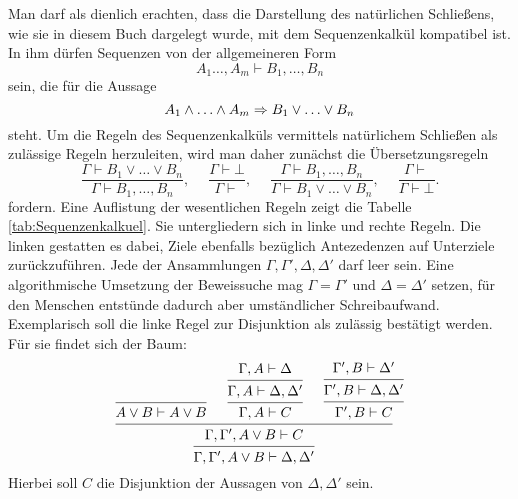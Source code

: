 Man darf als dienlich erachten, dass die Darstellung des natürlichen
Schließens, wie sie in diesem Buch dargelegt wurde, mit dem
Sequenzenkalkül kompatibel ist. In ihm dürfen Sequenzen von der
allgemeineren Form
\[A_1\ldots,A_m\vdash B_1,\ldots,B_n\]
sein, die für die Aussage
\[A_1\land\ldots\land A_m\Rightarrow B_1\lor\ldots\lor B_n\]
steht. Um die Regeln des Sequenzenkalküls vermittels natürlichem Schließen
als zulässige Regeln herzuleiten, wird man daher zunächst die
Übersetzungsregeln
\[\dfrac{\Gamma\vdash B_1\lor\ldots\lor B_n}{\Gamma\vdash B_1,\ldots,B_n},\quad\;
\dfrac{\Gamma\vdash\bot}{\Gamma\vdash},\quad\;
\dfrac{\Gamma\vdash B_1,\ldots,B_n}{\Gamma\vdash B_1\lor\ldots\lor B_n},\quad\;
\dfrac{\Gamma\vdash}{\Gamma\vdash\bot}.\]
fordern. Eine Auflistung der wesentlichen Regeln zeigt die Tabelle
\ref{tab:Sequenzenkalkuel}. Sie untergliedern sich in linke und rechte
Regeln. Die linken gestatten es dabei, Ziele ebenfalls bezüglich
Antezedenzen auf Unterziele zurückzuführen. Jede der Ansammlungen
$\Gamma,\Gamma',\Delta,\Delta'$ darf leer sein. Eine algorithmische
Umsetzung der Beweissuche mag $\Gamma=\Gamma'$ und $\Delta=\Delta'$
setzen, für den Menschen entstünde dadurch aber umständlicher
Schreibaufwand. Exemplarisch soll die linke Regel zur Disjunktion als
zulässig bestätigt werden. Für sie findet sich der Baum:
\[
\begin{prooftree}
    \infer0{A\lor B\vdash A\lor B}
        \hypo{\Gamma,A\vdash\Delta}
      \infer1{\Gamma,A\vdash\Delta,\Delta'}
    \infer1{\Gamma,A\vdash C}
        \hypo{\Gamma',B\vdash\Delta'}
      \infer1{\Gamma',B\vdash\Delta,\Delta'}
    \infer1{\Gamma',B\vdash C}
  \infer3{\Gamma,\Gamma',A\lor B\vdash C}
\infer1{\Gamma,\Gamma',A\lor B\vdash \Delta,\Delta'}
\end{prooftree}
\]
Hierbei soll $C$ die Disjunktion der Aussagen von $\Delta,\Delta'$ sein.

